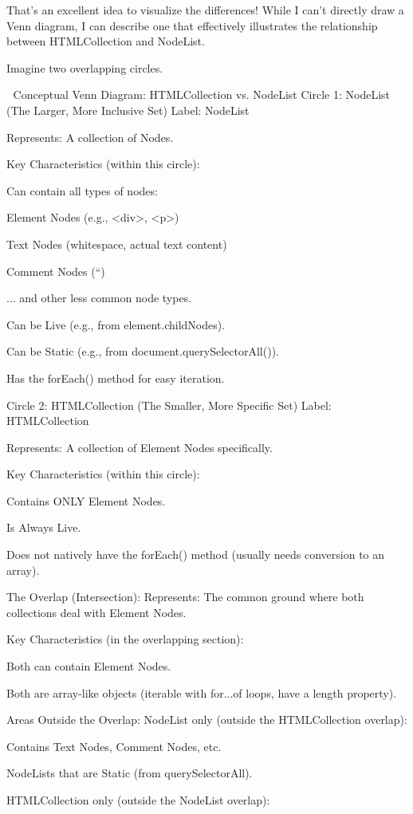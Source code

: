 That's an excellent idea to visualize the differences! While I can't directly draw a Venn diagram, I can describe one that effectively illustrates the relationship between HTMLCollection and NodeList.

Imagine two overlapping circles.

🎨 Conceptual Venn Diagram: HTMLCollection vs. NodeList
Circle 1: NodeList (The Larger, More Inclusive Set)
Label: NodeList

Represents: A collection of Nodes.

Key Characteristics (within this circle):

Can contain all types of nodes:

Element Nodes (e.g., <div>, <p>)

Text Nodes (whitespace, actual text content)

Comment Nodes (``)

... and other less common node types.

Can be Live (e.g., from element.childNodes).

Can be Static (e.g., from document.querySelectorAll()).

Has the forEach() method for easy iteration.

Circle 2: HTMLCollection (The Smaller, More Specific Set)
Label: HTMLCollection

Represents: A collection of Element Nodes specifically.

Key Characteristics (within this circle):

Contains ONLY Element Nodes.

Is Always Live.

Does not natively have the forEach() method (usually needs conversion to an array).

The Overlap (Intersection):
Represents: The common ground where both collections deal with Element Nodes.

Key Characteristics (in the overlapping section):

Both can contain Element Nodes.

Both are array-like objects (iterable with for...of loops, have a length property).

Areas Outside the Overlap:
NodeList only (outside the HTMLCollection overlap):

Contains Text Nodes, Comment Nodes, etc.

NodeLists that are Static (from querySelectorAll).

HTMLCollection only (outside the NodeList overlap):

